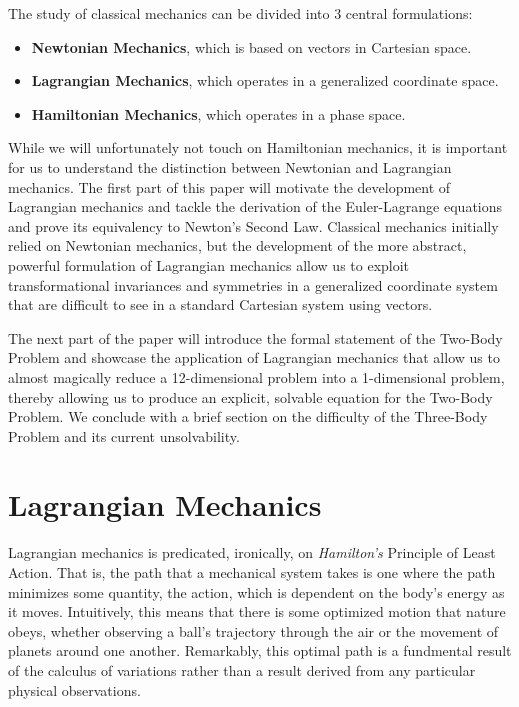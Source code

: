 \documentclass[10pt, psamsfonts]{amsart}
\theoremstyle{definition}
\theoremstyle{remark}
\numberwithin{equation}{section}
\begin{document}
The study of classical mechanics can be divided into 3 central formulations:
\begin{itemize}
  \item[] \textbf{Newtonian Mechanics}, which is based on vectors in Cartesian space.
  \item[] \textbf{Lagrangian Mechanics}, which operates in a generalized coordinate space.
  \item[] \textbf{Hamiltonian Mechanics}, which operates in a phase space.
\end{itemize}
While we will unfortunately not touch on Hamiltonian mechanics, it is important for us to understand the distinction between Newtonian and Lagrangian mechanics. The first part of this paper will motivate the development of Lagrangian mechanics and tackle the derivation of the Euler-Lagrange equations and prove its equivalency to Newton's Second Law. Classical mechanics initially relied on Newtonian mechanics, but the development of the more abstract, powerful formulation of Lagrangian mechanics allow us to exploit transformational invariances and symmetries in a generalized coordinate system that are difficult to see in a standard Cartesian system using vectors.

The next part of the paper will introduce the formal statement of the Two-Body Problem and showcase the application of Lagrangian mechanics that allow us to almost magically reduce a 12-dimensional problem into a 1-dimensional problem, thereby allowing us to produce an explicit, solvable equation for the Two-Body Problem. We conclude with a brief section on the difficulty of the Three-Body Problem and its current unsolvability.

\section{Lagrangian Mechanics}
Lagrangian mechanics is predicated, ironically, on \textit{Hamilton's} Principle of Least Action. That is, the path that a mechanical system takes is one where the path minimizes some quantity, the action, which is dependent on the body's energy as it moves. Intuitively, this means that there is some optimized motion that nature obeys, whether observing a ball's trajectory through the air or the movement of planets around one another. Remarkably, this optimal path is a fundmental result of the calculus of variations rather than a result derived from any particular physical observations.
\end{document}
